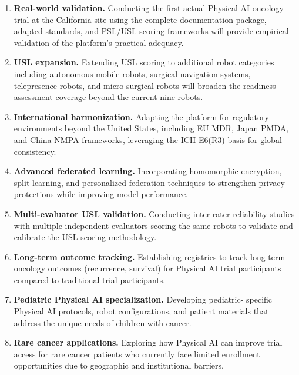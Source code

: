 \begin{enumerate}[nosep]
  \item \textbf{Real-world validation.} Conducting the first actual Physical AI
    oncology trial at the California site using the complete documentation
    package, adapted standards, and PSL/USL scoring frameworks will provide
    empirical validation of the platform's practical adequacy.

  \item \textbf{USL expansion.} Extending USL scoring to additional robot
    categories including autonomous mobile robots, surgical navigation systems,
    telepresence robots, and micro-surgical robots will broaden the
    readiness assessment coverage beyond the current nine robots.

  \item \textbf{International harmonization.} Adapting the platform for
    regulatory environments beyond the United States, including EU MDR,
    Japan PMDA, and China NMPA frameworks, leveraging the ICH E6(R3) basis
    for global consistency.

  \item \textbf{Advanced federated learning.} Incorporating homomorphic
    encryption, split learning, and personalized federation techniques to
    strengthen privacy protections while improving model performance.

  \item \textbf{Multi-evaluator USL validation.} Conducting inter-rater
    reliability studies with multiple independent evaluators scoring the same
    robots to validate and calibrate the USL scoring methodology.

  \item \textbf{Long-term outcome tracking.} Establishing registries to track
    long-term oncology outcomes (recurrence, survival) for Physical AI trial
    participants compared to traditional trial participants.

  \item \textbf{Pediatric Physical AI specialization.} Developing pediatric-
    specific Physical AI protocols, robot configurations, and patient
    materials that address the unique needs of children with cancer.

  \item \textbf{Rare cancer applications.} Exploring how Physical AI can
    improve trial access for rare cancer patients who currently face
    limited enrollment opportunities due to geographic and institutional
    barriers.
\end{enumerate}

